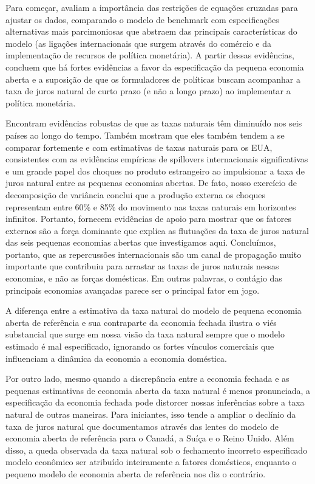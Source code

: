 Para começar, avaliam a importância das restrições de equações cruzadas para ajustar os dados, comparando o modelo de benchmark com especificações alternativas mais parcimoniosas que abstraem das principais características do modelo (as ligações internacionais que surgem através do comércio e da implementação de recursos de política monetária). A partir dessas evidências, concluem que há fortes evidências a favor da especificação da pequena economia aberta e a suposição de que os formuladores de políticas buscam acompanhar a taxa de juros natural de curto prazo (e não a longo prazo) ao implementar a política monetária.

Encontram evidências robustas de que as taxas naturais têm diminuído nos seis países ao longo do tempo. Também mostram que eles também tendem a se comparar fortemente e com estimativas de taxas naturais para os EUA, consistentes com as evidências empíricas de spillovers internacionais significativas e um grande papel dos choques no produto estrangeiro ao impulsionar a taxa de juros natural entre as pequenas economias abertas. De fato, nosso exercício de decomposição de variância conclui que a produção externa os choques representam entre 60$\%$ e 85$\%$ do movimento nas taxas naturais em horizontes infinitos. Portanto, fornecem evidências de apoio para mostrar que os fatores externos são a força dominante que explica as flutuações da taxa de juros natural das seis pequenas economias abertas que investigamos aqui. Concluímos, portanto, que as repercussões internacionais são um canal de propagação muito importante que contribuiu para arrastar as taxas de juros naturais nessas economias, e não as forças domésticas. Em outras palavras, o contágio das principais economias avançadas parece ser o principal fator em jogo.

A diferença entre a estimativa da taxa natural do modelo de pequena economia aberta de referência e sua contraparte da economia fechada ilustra o viés substancial que surge em nossa visão da taxa natural sempre que o modelo estimado é mal especificado, ignorando os fortes vínculos comerciais que influenciam a dinâmica da economia a economia doméstica.

Por outro lado, mesmo quando a discrepância entre a economia fechada e as pequenas estimativas de economia aberta da taxa natural é menos pronunciada, a especificação da economia fechada pode distorcer nossas inferências sobre a taxa natural de outras maneiras. Para iniciantes, isso tende a ampliar o declínio da taxa de juros natural que documentamos através das lentes do modelo de economia aberta de referência para o Canadá, a Suíça e o Reino Unido. Além disso, a queda observada da taxa natural sob o fechamento incorreto especificado modelo econômico ser atribuído inteiramente a fatores domésticos, enquanto o pequeno modelo de economia aberta de referência nos diz o contrário.

